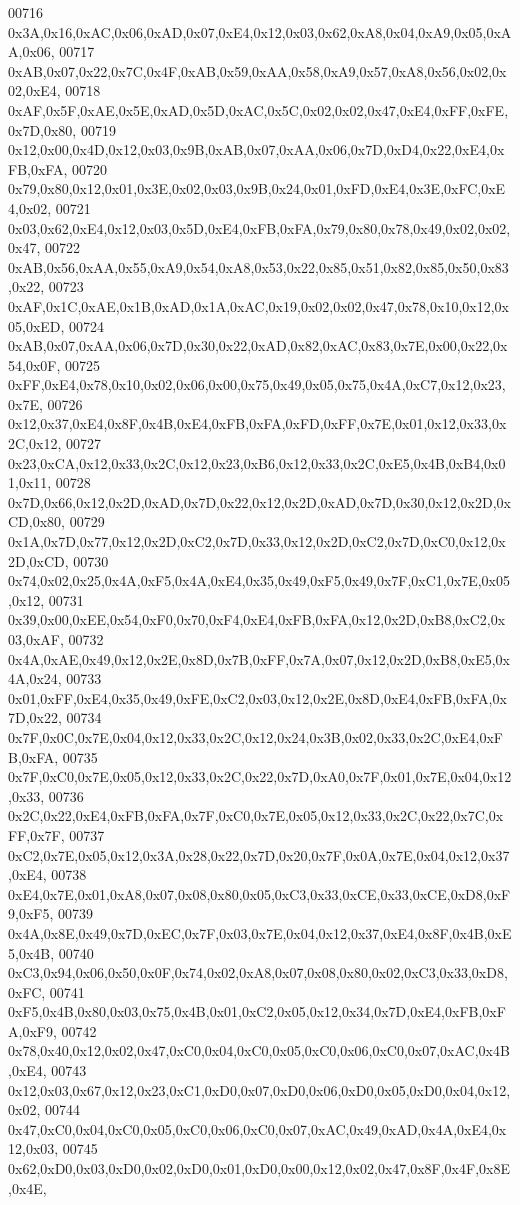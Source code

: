 \begin{DoxyCode}
00716 0x3A,0x16,0xAC,0x06,0xAD,0x07,0xE4,0x12,0x03,0x62,0xA8,0x04,0xA9,0x05,0xAA,0x06,
00717 0xAB,0x07,0x22,0x7C,0x4F,0xAB,0x59,0xAA,0x58,0xA9,0x57,0xA8,0x56,0x02,0x02,0xE4,
00718 0xAF,0x5F,0xAE,0x5E,0xAD,0x5D,0xAC,0x5C,0x02,0x02,0x47,0xE4,0xFF,0xFE,0x7D,0x80,
00719 0x12,0x00,0x4D,0x12,0x03,0x9B,0xAB,0x07,0xAA,0x06,0x7D,0xD4,0x22,0xE4,0xFB,0xFA,
00720 0x79,0x80,0x12,0x01,0x3E,0x02,0x03,0x9B,0x24,0x01,0xFD,0xE4,0x3E,0xFC,0xE4,0x02,
00721 0x03,0x62,0xE4,0x12,0x03,0x5D,0xE4,0xFB,0xFA,0x79,0x80,0x78,0x49,0x02,0x02,0x47,
00722 0xAB,0x56,0xAA,0x55,0xA9,0x54,0xA8,0x53,0x22,0x85,0x51,0x82,0x85,0x50,0x83,0x22,
00723 0xAF,0x1C,0xAE,0x1B,0xAD,0x1A,0xAC,0x19,0x02,0x02,0x47,0x78,0x10,0x12,0x05,0xED,
00724 0xAB,0x07,0xAA,0x06,0x7D,0x30,0x22,0xAD,0x82,0xAC,0x83,0x7E,0x00,0x22,0x54,0x0F,
00725 0xFF,0xE4,0x78,0x10,0x02,0x06,0x00,0x75,0x49,0x05,0x75,0x4A,0xC7,0x12,0x23,0x7E,
00726 0x12,0x37,0xE4,0x8F,0x4B,0xE4,0xFB,0xFA,0xFD,0xFF,0x7E,0x01,0x12,0x33,0x2C,0x12,
00727 0x23,0xCA,0x12,0x33,0x2C,0x12,0x23,0xB6,0x12,0x33,0x2C,0xE5,0x4B,0xB4,0x01,0x11,
00728 0x7D,0x66,0x12,0x2D,0xAD,0x7D,0x22,0x12,0x2D,0xAD,0x7D,0x30,0x12,0x2D,0xCD,0x80,
00729 0x1A,0x7D,0x77,0x12,0x2D,0xC2,0x7D,0x33,0x12,0x2D,0xC2,0x7D,0xC0,0x12,0x2D,0xCD,
00730 0x74,0x02,0x25,0x4A,0xF5,0x4A,0xE4,0x35,0x49,0xF5,0x49,0x7F,0xC1,0x7E,0x05,0x12,
00731 0x39,0x00,0xEE,0x54,0xF0,0x70,0xF4,0xE4,0xFB,0xFA,0x12,0x2D,0xB8,0xC2,0x03,0xAF,
00732 0x4A,0xAE,0x49,0x12,0x2E,0x8D,0x7B,0xFF,0x7A,0x07,0x12,0x2D,0xB8,0xE5,0x4A,0x24,
00733 0x01,0xFF,0xE4,0x35,0x49,0xFE,0xC2,0x03,0x12,0x2E,0x8D,0xE4,0xFB,0xFA,0x7D,0x22,
00734 0x7F,0x0C,0x7E,0x04,0x12,0x33,0x2C,0x12,0x24,0x3B,0x02,0x33,0x2C,0xE4,0xFB,0xFA,
00735 0x7F,0xC0,0x7E,0x05,0x12,0x33,0x2C,0x22,0x7D,0xA0,0x7F,0x01,0x7E,0x04,0x12,0x33,
00736 0x2C,0x22,0xE4,0xFB,0xFA,0x7F,0xC0,0x7E,0x05,0x12,0x33,0x2C,0x22,0x7C,0xFF,0x7F,
00737 0xC2,0x7E,0x05,0x12,0x3A,0x28,0x22,0x7D,0x20,0x7F,0x0A,0x7E,0x04,0x12,0x37,0xE4,
00738 0xE4,0x7E,0x01,0xA8,0x07,0x08,0x80,0x05,0xC3,0x33,0xCE,0x33,0xCE,0xD8,0xF9,0xF5,
00739 0x4A,0x8E,0x49,0x7D,0xEC,0x7F,0x03,0x7E,0x04,0x12,0x37,0xE4,0x8F,0x4B,0xE5,0x4B,
00740 0xC3,0x94,0x06,0x50,0x0F,0x74,0x02,0xA8,0x07,0x08,0x80,0x02,0xC3,0x33,0xD8,0xFC,
00741 0xF5,0x4B,0x80,0x03,0x75,0x4B,0x01,0xC2,0x05,0x12,0x34,0x7D,0xE4,0xFB,0xFA,0xF9,
00742 0x78,0x40,0x12,0x02,0x47,0xC0,0x04,0xC0,0x05,0xC0,0x06,0xC0,0x07,0xAC,0x4B,0xE4,
00743 0x12,0x03,0x67,0x12,0x23,0xC1,0xD0,0x07,0xD0,0x06,0xD0,0x05,0xD0,0x04,0x12,0x02,
00744 0x47,0xC0,0x04,0xC0,0x05,0xC0,0x06,0xC0,0x07,0xAC,0x49,0xAD,0x4A,0xE4,0x12,0x03,
00745 0x62,0xD0,0x03,0xD0,0x02,0xD0,0x01,0xD0,0x00,0x12,0x02,0x47,0x8F,0x4F,0x8E,0x4E,

\end{DoxyCode}
